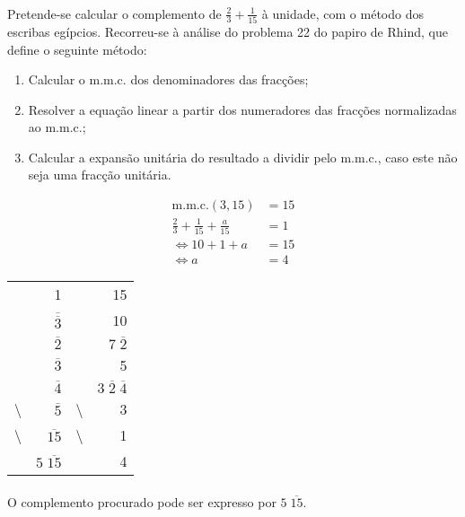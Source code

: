 
\paragraph{} Pretende-se calcular o complemento de $\frac{2}{3}+\frac{1}{15}$
à unidade, com o método dos escribas egípcios. Recorreu-se à análise do
problema 22 do papiro de Rhind\parencite[pág. 37-38]{Estrada2000}, que define
o seguinte método:

\begin{enumerate}
	\item Calcular o m.m.c. dos denominadores das fracções;
	\item Resolver a equação linear a partir dos numeradores das fracções
		normalizadas ao m.m.c.;
	\item Calcular a expansão unitária do resultado a dividir pelo m.m.c.,
		caso este não seja uma fracção unitária.
\end{enumerate}

\begin{align*}
	\text{m.m.c.}(3, 15) &= 15 \\
	\frac{2}{3} + \frac{1}{15} + \frac{a}{15} &= 1\\
	\iff10 + 1 + a &= 15 \\
		\iff a &= 4
\end{align*}

\begin{table}[h]
	\centering
	\begin{tabular}{cr|cr}
		&1&&15\\
		&$\overline{\overline{3}}$&&10\\
		&$\overline{2}$&&$7 \; \overline{2}$\\
		&$\overline{3}$&&5\\
		&$\overline{4}$&&$3 \; \overline{2} \; \overline{4}$\\
		\textbackslash&$\overline{5}$&\textbackslash&3\\
		\textbackslash&$\overline{15}$&\textbackslash&1\\
		\hline
		&$5 \; \overline{15}$&&4
	\end{tabular}
\end{table}

\paragraph{} O complemento procurado pode ser expresso por
$5 \; \overline{15}$.

